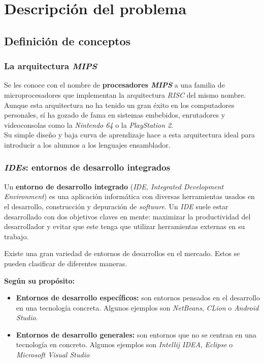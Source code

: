 \chapter{Descripción del problema} \label{ch:descripcion-del-problema}


\section{Definición de conceptos}\label{sec:definicion-de-conceptos}

\subsection{La arquitectura \textit{MIPS}}\label{subsec:la-arquitectura-mips}

Se les conoce con el nombre de \textbf{procesadores \textit{MIPS}} a una familia de microprocesadores que implementan
la arquitectura \textit{RISC} del mismo nombre.
Aunque esta arquitectura no ha tenido un gran éxito en los computadores personales, sí ha gozado de fama en
sistemas embebidos, enrutadores y videoconsolas como la \textit{Nintendo 64} o la \textit{PlayStation 2}. \\

\noindent Su simple diseño y baja curva de aprendizaje hace a esta arquitectura ideal para introducir a los alumnos
a los lenguajes ensamblador.

\subsection{\textit{IDEs}: entornos de desarrollo integrados}\label{subsec:ides-entornos-de-desarrollo-integrados}

Un \textbf{entorno de desarrollo integrado} (\textit{IDE, Integrated Development Environment}) es una aplicación
informática con diversas herramientas usados en el desarrollo, construcción y depuración de \textit{software}.
Un \textit{IDE} suele estar desarrollado con dos objetivos claves en mente: maximizar la productividad del
desarrollador y evitar que este tenga que utilizar herramientas externas en su trabajo.

\noindent Existe una gran variedad de entornos de desarrollos en el mercado.
Estos se pueden clasificar de diferentes maneras.

\noindent \textbf{Según su propósito:}
\begin{itemize}
    \item \textbf{Entornos de desarrollo específicos:} son entornos pensados en el desarrollo en una
    tecnología concreta.
    Algunos ejemplos son \textit{NetBeans}, \textit{CLion} o \textit{Android Studio}.
    \item \textbf{Entornos de desarrollo generales:} son entornos que no se centran en una tecnología en concreto.
    Algunos ejemplos son \textit{Intellij IDEA}\cite{INTELLIJIDEA},
    \textit{Eclipse}\cite{ECLIPSE} o \textit{Microsoft Visual Studio}\cite{VISUALSTUDIO}
\end{itemize}

